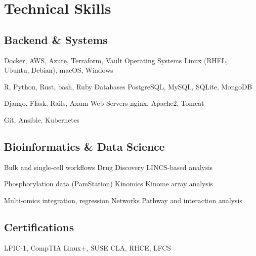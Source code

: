 \section{Technical Skills}

\subsection{Backend \& Systems}

{Docker, AWS, Azure, Terraform, Vault}
{Operating Systems}
{Linux (RHEL, Ubuntu, Debian), macOS, Windows}

{R, Python, Rust, bash, Ruby}
{Databases}
{PostgreSQL, MySQL, SQLite, MongoDB}

{Django, Flask, Rails, Axum}
{Web Servers}
{nginx, Apache2, Tomcat}

{Git, Ansible, Kubernetes}

\subsection{Bioinformatics \& Data Science}

{Bulk and single-cell workflows}
{Drug Discovery}
{LINCS-based analysis}

{Phosphorylation data (PamStation)}
{Kinomics}
{Kinome array analysis}

{Multi-omics integration, regression}
{Networks}
{Pathway and interaction analysis}

\subsection{Certifications}

{LPIC-1, CompTIA Linux+, SUSE CLA, RHCE, LFCS}
